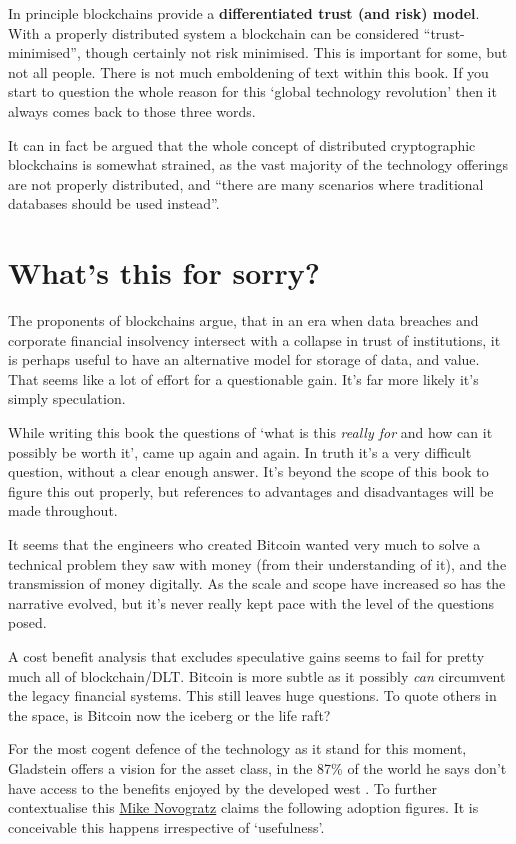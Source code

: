 In principle blockchains provide a \textbf{differentiated trust (and risk) model}. With a properly distributed system a blockchain can be considered ``trust-minimised'', though certainly not risk minimised. This is important for some, but not all people. There is not much emboldening of text within this book. If you start to question the whole reason for this `global technology revolution' then it always comes back to those three words. \par
It can in fact be argued that the whole concept of distributed cryptographic blockchains is somewhat strained, as the vast majority of the technology offerings are not properly distributed, and ``there are many scenarios where traditional databases should be used instead''\cite{casino2019systematic}.\par
\section{What's this for sorry?}
The proponents of blockchains argue, that in an era when data breaches and corporate financial insolvency intersect with a collapse in trust of institutions, it is perhaps useful to have an alternative model for storage of data, and value. That seems like a lot of effort for a questionable gain. It's far more likely it's simply speculation.\par 
While writing this book the questions of `what is this \textit{really for} and how can it possibly be worth it', came up again and again. In truth it's a very difficult question, without a clear enough answer. It's beyond the scope of this book to figure this out properly, but references to advantages and disadvantages will be made throughout.\par  
It seems that the engineers who created Bitcoin wanted very much to solve a technical problem they saw with money (from their understanding of it), and the transmission of money digitally. As the scale and scope have increased so has the narrative evolved, but it's never really kept pace with the level of the questions posed. \par
A cost benefit analysis that excludes speculative gains seems to fail for pretty much all of blockchain/DLT. Bitcoin is more subtle as it possibly \textit{can} circumvent the legacy financial systems. This still leaves huge questions. To quote others in the space, is Bitcoin now the iceberg or the life raft? \par 
For the most cogent defence of the technology as it stand for this moment, Gladstein offers a vision for the asset class, in the 87\% of the world he says don't have access to the benefits enjoyed by the developed west \cite{gladsteincheck2022}. To further contextualise this \href{https://www.youtube.com/watch?v=BRQIMjZLMDk}{Mike Novogratz} claims the following adoption figures. It is conceivable this happens irrespective of `usefulness'.\par
